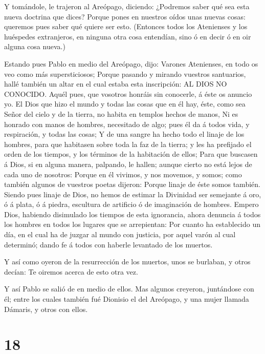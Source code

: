  Y tomándole, le trajeron al Areópago, diciendo: ¿Podremos
saber qué sea esta nueva doctrina que dices?  Porque pones
en nuestros oídos unas nuevas cosas: queremos pues saber qué quiere ser
esto.  (Entonces todos los Atenienses y los huéspedes
extranjeros, en ninguna otra cosa entendían, sino ó en decir ó en oir
alguna cosa nueva.)

 Estando pues Pablo en medio del Areópago, dijo: Varones
Atenienses, en todo os veo como más supersticiosos;  Porque
pasando y mirando vuestros santuarios, hallé también un altar en el cual
estaba esta inscripción: AL DIOS NO CONOCIDO. Aquél pues, que vosotros
honráis sin conocerle, á éste os anuncio yo.  El Dios que
hizo el mundo y todas las cosas que en él hay, éste, como sea Señor del
cielo y de la tierra, no habita en templos hechos de manos,
 Ni es honrado con manos de hombres, necesitado de algo;
pues él da á todos vida, y respiración, y todas las cosas; 
Y de una sangre ha hecho todo el linaje de los hombres, para que
habitasen sobre toda la faz de la tierra; y les ha prefijado el orden de
los tiempos, y los términos de la habitación de ellos; 
Para que buscasen á Dios, si en alguna manera, palpando, le hallen;
aunque cierto no está lejos de cada uno de nosotros: 
Porque en él vivimos, y nos movemos, y somos; como también algunos de
vuestros poetas dijeron: Porque linaje de éste somos también.
 Siendo pues linaje de Dios, no hemos de estimar la
Divinidad ser semejante á oro, ó á plata, ó á piedra, escultura de
artificio ó de imaginación de hombres.  Empero Dios,
habiendo disimulado los tiempos de esta ignorancia, ahora denuncia á
todos los hombres en todos los lugares que se arrepientan: 
Por cuanto ha establecido un día, en el cual ha de juzgar al mundo con
justicia, por aquel varón al cual determinó; dando fe á todos con
haberle levantado de los muertos.

 Y así como oyeron de la resurrección de los muertos, unos
se burlaban, y otros decían: Te oiremos acerca de esto otra vez.

 Y así Pablo se salió de en medio de ellos. 
Mas algunos creyeron, juntándose con él; entre los cuales también fué
Dionisio el del Areópago, y una mujer llamada Dámaris, y otros con
ellos.

\hypertarget{section-17}{%
\section{18}\label{section-17}}

